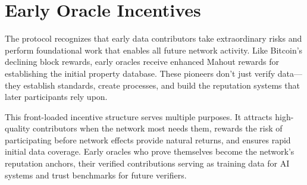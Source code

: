 \section{Early Oracle Incentives}

The protocol recognizes that early data contributors take extraordinary risks and perform foundational work that enables all future network activity. Like Bitcoin's declining block rewards, early oracles receive enhanced Mahout rewards for establishing the initial property database. These pioneers don't just verify data---they establish standards, create processes, and build the reputation systems that later participants rely upon.

This front-loaded incentive structure serves multiple purposes. It attracts high-quality contributors when the network most needs them, rewards the risk of participating before network effects provide natural returns, and ensures rapid initial data coverage. Early oracles who prove themselves become the network's reputation anchors, their verified contributions serving as training data for AI systems and trust benchmarks for future verifiers.

